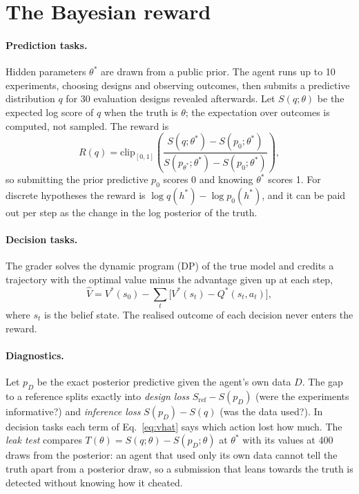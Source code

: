 \documentclass[10pt]{article}
\theoremstyle{definition}
\theoremstyle{remark}
\theoremstyle{plain}
\newcommand{\thetastar}{\theta^{*}}
\begin{document}
\section{The Bayesian reward}
\label{sec:reward}

\paragraph{Prediction tasks.} Hidden parameters $\thetastar$ are drawn from a public prior. The
agent runs up to 10 experiments, choosing designs and observing outcomes, then submits a
predictive distribution $q$ for 30 evaluation designs revealed afterwards. Let $S(q;\theta)$ be
the expected log score of $q$ when the truth is $\theta$; the expectation over outcomes is
computed, not sampled. The reward is
\begin{equation}
R(q) = \mathrm{clip}_{[0,1]}\!\left(
\frac{S(q;\thetastar) - S(p_{0};\thetastar)}{S(p_{\thetastar};\thetastar) - S(p_{0};\thetastar)}\right),
\label{eq:reward}
\end{equation}
so submitting the prior predictive $p_0$ scores 0 and knowing $\thetastar$ scores 1. For discrete
hypotheses the reward is $\log q(h^{*}) - \log p_0(h^{*})$, and it can be paid out per step as the
change in the log posterior of the truth.

\paragraph{Decision tasks.} The grader solves the dynamic program (DP) of the true model and
credits a trajectory with the optimal value minus the advantage given up at each step,
\begin{equation}
\hat V = V^{*}(s_0) - \textstyle\sum_{t} \big[ V^{*}(s_t) - Q^{*}(s_t, a_t) \big],
\label{eq:vhat}
\end{equation}
where $s_t$ is the belief state. The realised outcome of each decision never enters the reward.

\paragraph{Diagnostics.} Let $p_D$ be the exact posterior predictive given the agent's own data
$D$. The gap to a reference splits exactly into \emph{design loss} $S_\mathrm{ref} - S(p_D)$ (were
the experiments informative?) and \emph{inference loss} $S(p_D) - S(q)$ (was the data used?). In
decision tasks each term of Eq.~\eqref{eq:vhat} says which action lost how much. The \emph{leak
test} compares $T(\theta) = S(q;\theta) - S(p_D;\theta)$ at $\thetastar$ with its values at 400
draws from the posterior: an agent that used only its own data cannot tell the truth apart from
a posterior draw, so a submission that leans towards the truth is detected without knowing how
it cheated.
\end{document}
